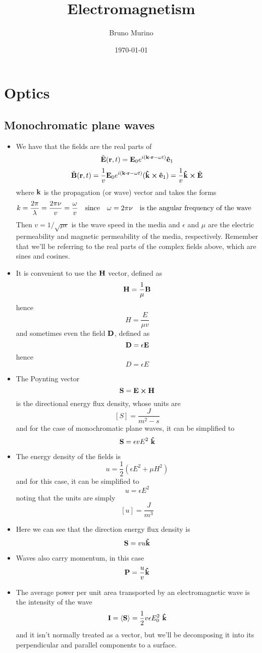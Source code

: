 \documentclass[oneside, 10pt, notitlepage]{book}
\title{Electromagnetism} %
\author{Bruno Murino} %
\date{\today} %
\begin{document}
\frontmatter

\dominitoc
\faketableofcontents

\mainmatter

\chapter{Optics}
\section{Monochromatic plane waves}
\begin{itemize}
    \item We have that the fields are the real parts of
    $$\tilde{\vb{E}}(\vb{r}, t) = \vb{E}_0e^{i(\vb{k}\vdot \vb{r} - \omega t)}\vu{e}_1$$
    $$\tilde{\vb{B}}(\vb{r}, t) = \frac{1}{v}\vb{E}_0e^{i(\vb{k}\vdot \vb{r} - \omega t)}(\vu{k}\cross \vu{e}_1) = \frac{1}{v}\vu{k} \cross \tilde{\vb{E}}$$
    where $\vb{k}$ is the propagation (or wave) vector and takes the forms
    $$k = \frac{2\pi}{\lambda} = \frac{2\pi \nu}{v} = \frac{\omega}{v}\qq{since} \omega = 2\pi \nu \qq{is the angular frequency of the wave}$$
    Then $v = 1/\sqrt{\mu \epsilon}$ is the wave speed in the media and $\epsilon$ and $\mu$ are the electric permeability  and magnetic permeability of the media, respectively. Remember that we'll be referring to the real parts of the complex fields above, which are sines and cosines.
    \item It is convenient to use the $\vb{H}$ vector, defined as
    $$\vb{H} = \frac{1}{\mu}\vb{B}$$
    hence
    $$H = \frac{E}{\mu v}$$
    and sometimes even the field $\vb{D}$, defined as
    $$\vb{D} = \epsilon \vb{E}$$
    hence
    $$D=\epsilon E$$
    \item The Poynting vector 
    $$\vb{S} = \vb{E}\cross\vb{H}$$
    is the directional energy flux density, whose units are
    $$[S] = \frac{J}{m^2-s}$$
    and for the case of monochromatic plane waves, it can be simplified to
    $$\vb{S} =\epsilon v E^2\ \vu{k}$$
    \item The energy density of the fields is
    $$u=\frac{1}{2}(\epsilon E^2 + \mu H^2)$$
    and for this case, it can be simplified to
    $$u= \epsilon E^2$$
    noting that the units are simply $$[u] = \frac{J}{m^3}$$
    \item Here we can see that the direction energy flux density is
    $$\vb{S} = vu\vu{k}$$
    \item Waves also carry momentum, in this case
    $$\vb{P} = \frac{u}{v}\vu{k}$$
    \item The average power per unit area transported by an electromagnetic wave is the intensity of the wave
    $$\vb{I} = \left< \vb{S} \right> = \frac{1}{2}v\epsilon E_0^2\ \vu{k}$$
    and it isn't normally treated as a vector, but we'll be decomposing it into its perpendicular and parallel components to a surface.
    \end{itemize}
    
\end{document}
